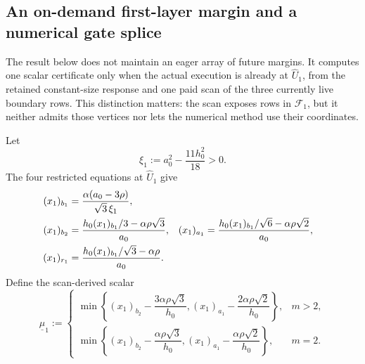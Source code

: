 \subsection{An on-demand first-layer margin and a numerical gate splice}
\label{sec:branch-caterpillar-first-layer-numerical-splice}

The result below does not maintain an eager array of future margins.  It
computes one scalar certificate only when the actual execution is already at
$\widehat U_1$, from the retained constant-size response and one paid scan of
the three currently live boundary rows.  This distinction matters: the scan
exposes rows in $\mathcal F_1$, but it neither admits those vertices nor lets
the numerical method use their coordinates.

Let
\begin{equation}
 \xi_1:=a_0^2-\frac{11h_0^2}{18}>0.
 \label{eq:branch-caterpillar-first-layer-response-denominator}
\end{equation}
The four restricted equations at $\widehat U_1$ give
\begin{align}
 (x_1)_{b_1}
  &=\frac{\alpha(a_0-3\rho)}{\sqrt3\,\xi_1},
 \notag\\
 (x_1)_{b_2}
  &=\frac{h_0(x_1)_{b_1}/3-\alpha\rho\sqrt3}{a_0},
 &
 (x_1)_{a_1}
  &=\frac{h_0(x_1)_{b_1}/\sqrt6-\alpha\rho\sqrt2}{a_0},
 \notag\\
 (x_1)_{r_1}
  &=\frac{h_0(x_1)_{b_1}/\sqrt3-\alpha\rho}{a_0}.
 \label{eq:branch-caterpillar-first-layer-response-formula}
\end{align}
Define the scan-derived scalar
\begin{equation}
 \underline\mu_1:=
 \begin{cases}
  \min\left\{
   (x_1)_{b_2}-\dfrac{3\alpha\rho\sqrt3}{h_0},
   (x_1)_{a_1}-\dfrac{2\alpha\rho\sqrt2}{h_0}
       \right\},&m>2,\\[7pt]
  \min\left\{
   (x_1)_{b_2}-\dfrac{\alpha\rho\sqrt3}{h_0},
   (x_1)_{a_1}-\dfrac{\alpha\rho\sqrt2}{h_0}
       \right\},&m=2.
 \end{cases}
 \label{eq:branch-caterpillar-first-layer-local-margin}
\end{equation}

